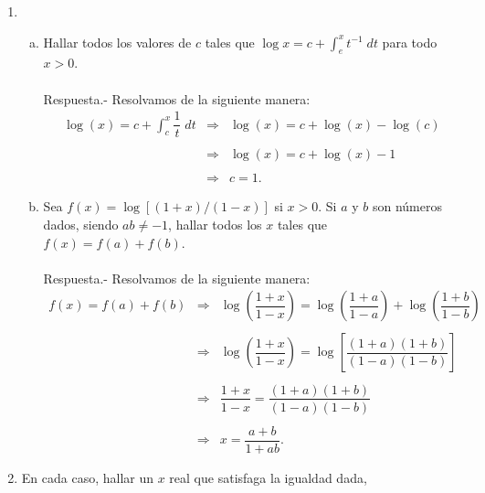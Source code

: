 \begin{enumerate}[\bfseries 1.]

    \item 
	\begin{enumerate}[a)]

	    \item Hallar todos los valores de $c$ tales que $\log x = c + \displaystyle\int_e^x t^{-1}\; dt$ para todo $x>0$.\\\\
		Respuesta.- Resolvamos de la siguiente manera:
		$$
		\begin{array}{rcl}
		    \log(x) = c+\displaystyle\int_c^x \dfrac{1}{t}\; dt &\Rightarrow& \log(x) = c+\log(x)-\log(c)\\\\
									&\Rightarrow& \log(x)=c+\log(x)-1\\\\ 
									&\Rightarrow& c=1.
		\end{array}
		$$

	    \item Sea $f(x)=\log\left[(1+x)/(1-x)\right]$ si $x>0$. Si $a$ y $b$ son números dados, siendo $ab\neq -1$, hallar todos los $x$ tales que $f(x)=f(a)+f(b)$.\\\\
		Respuesta.- Resolvamos de la siguiente manera:
		$$
		\begin{array}{rcl}
		    f(x)=f(a)+f(b) &\Rightarrow& \log\left(\dfrac{1+x}{1-x}\right) = \log\left(\dfrac{1+a}{1-a}\right)+\log\left(\dfrac{1+b}{1-b}\right)\\\\
				   &\Rightarrow& \log\left(\dfrac{1+x}{1-x}\right) = \log\left[\dfrac{(1+a)(1+b)}{(1-a)(1-b)}\right]\\\\
				   &\Rightarrow& \dfrac{1+x}{1-x} = \dfrac{(1+a)(1+b)}{(1-a)(1-b)}\\\\
				   &\Rightarrow& x = \dfrac{a+b}{1+ab}.
		\end{array}
		$$
		\vspace{.5cm}

	\end{enumerate}

    \item En cada caso, hallar un $x$ real que satisfaga la igualdad dada,

	\begin{enumerate}[(a)]


\end{enumerate}
\end{enumerate}
